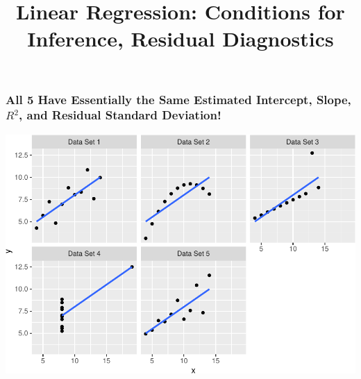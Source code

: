 \documentclass[14pt]{extarticle}
\title{Linear Regression: Conditions for Inference, Residual Diagnostics}
\author{}
\date{}
\begin{document}
\maketitle

\subsubsection{\texorpdfstring{All 5 Have Essentially the Same Estimated
Intercept, Slope, \(R^2\), and Residual Standard
Deviation!}{All 5 Have Essentially the Same Estimated Intercept, Slope, R\^{}2, and Residual Standard Deviation!}}\label{all-5-have-essentially-the-same-estimated-intercept-slope-r2-and-residual-standard-deviation}

\includegraphics{20181112_anscombe_residuals_files/figure-latex/unnamed-chunk-1-1.pdf}
\end{document}
